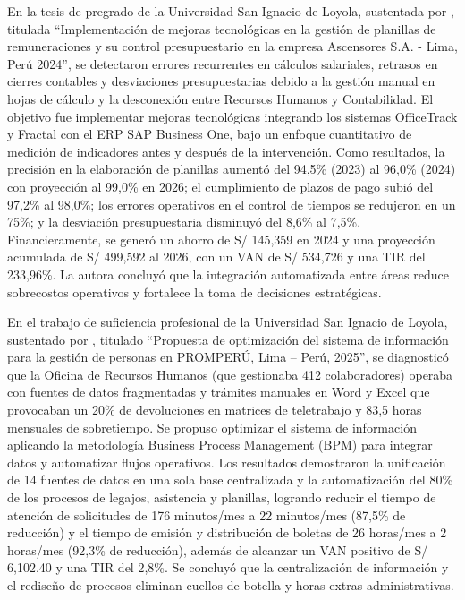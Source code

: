 En la tesis de pregrado de la Universidad San Ignacio de Loyola, sustentada por \textcite{quispe2025implementacion}, 
titulada ``Implementación de mejoras tecnológicas en la gestión de planillas de remuneraciones y su control presupuestario en la empresa Ascensores S.A. - Lima, Perú 2024'', 
se detectaron errores recurrentes en cálculos salariales, retrasos en cierres contables y desviaciones presupuestarias debido a la gestión manual en hojas de cálculo y 
la desconexión entre Recursos Humanos y Contabilidad. El objetivo fue implementar mejoras tecnológicas integrando los sistemas OfficeTrack y Fractal con el ERP SAP Business One, 
bajo un enfoque cuantitativo de medición de indicadores antes y después de la intervención. Como resultados, 
la precisión en la elaboración de planillas aumentó del 94,5\% (2023) al 96,0\% (2024) con proyección al 99,0\% en 2026; el cumplimiento 
de plazos de pago subió del 97,2\% al 98,0\%; los errores operativos en el control de tiempos se redujeron en un 75\%; y la desviación 
presupuestaria disminuyó del 8,6\% al 7,5\%. Financieramente, se generó un ahorro de S/ 145,359 en 2024 y una proyección acumulada de S/ 499,592 al 2026, 
con un VAN de S/ 534,726 y una TIR del 233,96\%. La autora concluyó que la integración automatizada entre áreas reduce sobrecostos operativos 
y fortalece la toma de decisiones estratégicas.

En el trabajo de suficiencia profesional de la Universidad San Ignacio de Loyola, sustentado por \textcite{pedroza2025propuesta}, 
titulado ``Propuesta de optimización del sistema de información para la gestión de personas en PROMPERÚ, Lima – Perú, 2025'', 
se diagnosticó que la Oficina de Recursos Humanos (que gestionaba 412 colaboradores) operaba con fuentes de datos fragmentadas y 
trámites manuales en Word y Excel que provocaban un 20\% de devoluciones en matrices de teletrabajo y 83,5 horas mensuales de sobretiempo. 
Se propuso optimizar el sistema de información aplicando la metodología Business Process Management (BPM) para integrar datos y automatizar flujos operativos. 
Los resultados demostraron la unificación de 14 fuentes de datos en una sola base centralizada y la automatización del 80\% de los procesos de legajos,
asistencia y planillas, logrando reducir el tiempo de atención de solicitudes de 176 minutos/mes a 22 minutos/mes (87,5\% de reducción) 
y el tiempo de emisión y distribución de boletas de 26 horas/mes a 2 horas/mes (92,3\% de reducción), además de alcanzar un 
VAN positivo de S/ 6,102.40 y una TIR del 2,8\%. Se concluyó que la centralización de información y el rediseño de procesos eliminan cuellos de botella y horas extras administrativas.

